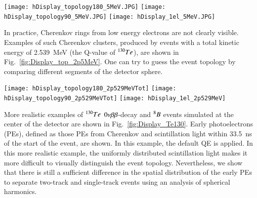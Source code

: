 \begin{figure*}[h]
  \centering
  \texttt{[image: hDisplay\_topology180\_5MeV.JPG]}
  \texttt{[image: hDisplay\_topology90\_5MeV.JPG]}
  \texttt{[image: hDisplay\_1el\_5MeV.JPG]}
  \caption{Cherenkov photons distributions on the detector sphere for
    the three representative event topologies: two back-to-back
    electrons (\emph{left}), two electrons at 90$^{\circ}$ angle
    (\emph{middle}), and a single electron (\emph{center}).  All
    electrons are 5~MeV and originate at the center of the
    detector. 100 events overlayed for better visibility of the
    Cherenkov rings. 100\% QE is assumed. }
  \label{fig:Display_top_5MeV}
\end{figure*}

In practice, Cherenkov rings from low energy electrons are not clearly visible. Examples of such Cherenkov clusters, produced by events with a total kinetic energy of 2.539~MeV (the Q-value of $^{130}Te$), are shown in Fig.~\ref{fig:Display_top_2p5MeV}. One can try to guess the event topology by comparing different segments of the detector sphere.

\begin{figure*}[h]
  \centering
  \texttt{[image: hDisplay\_topology180\_2p529MeVTot]}
  \texttt{[image: hDisplay\_topology90\_2p529MeVTot]}
  \texttt{[image: hDisplay\_1el\_2p529MeV]}
  \caption{Cherenkov photons distributions on the detector sphere for
    the three representative event topologies: two back-to-back 1.26~MeV
    electrons (\emph{left}), two 1.26~MeV electrons at 90$^{\circ}$
    angle (\emph{middle}), and a single 2.529~MeV electron
    (\emph{center}).  All electrons originate at the center of the
    detector. One randomly selected event is chosen for each
    category. Default QE is applied.}
  \label{fig:Display_top_2p5MeV}
\end{figure*}

More realistic examples of $^{130}Te$ $0\nu\beta\beta$-decay and $^{8}B$ events simulated at the center of the detector are shown in Fig.~\ref{fig:Display_Te130}. Early photoelectrons (PEs), defined as those PEs from Cherenkov and scintillation light within 33.5~ns of the start of the event, are shown. In this example, the default QE is applied.  In this more realistic example, the uniformly distributed scintillation light makes it more difficult to visually distinguish the event topology. Nevertheless, we show that there is still a sufficient difference in the spatial distribution of the early PEs to separate two-track and single-track events using an analysis of spherical harmonics.

